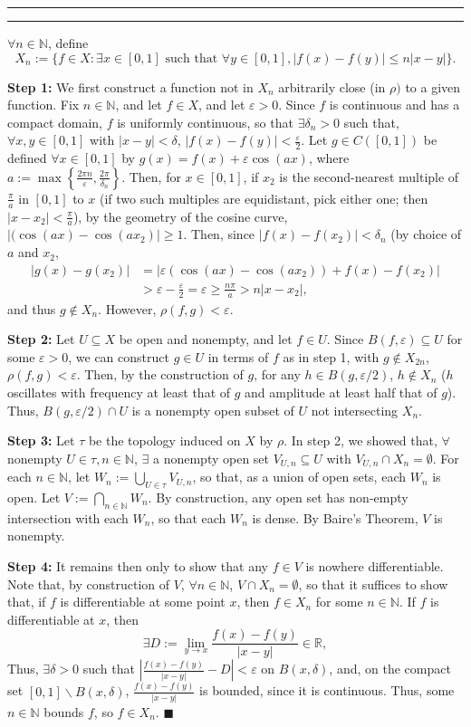 \documentclass[11pt]{article}
\newcounter{questionCounter}
\newcounter{partCounter}[questionCounter]
\newenvironment{question}[2][\arabic{questionCounter}]{%
    \setcounter{partCounter}{0}%
    \vspace{.25in} \hrule \vspace{0.5em}%
        \noindent{\bf #2}%
    \vspace{0.8em} \hrule \vspace{.10in}%
    \addtocounter{questionCounter}{1}%
}{}
\renewcommand{\qed}{\quad $\blacksquare$}
\newcommand{\sminus}{\backslash}
\newcommand{\N}{\mathbb{N}} %
\newcommand{\R}{\mathbb{R}} %
\newcommand{\e}{\varepsilon} %
\begin{document}
\newpage
\begin{question}{Problem 10}
$\forall n \in \N$, define
\[X_n := \{f \in X : \exists x \in [0,1] \mbox{ such that }
\forall y \in [0,1], |f(x) - f(y)| \leq n|x - y|\}.\]

{\bf Step 1:}
We first construct a function not in $X_n$ arbitrarily close (in $\rho)$ to a
given function. Fix $n \in \N$, and let $f \in X$, and let $\e > 0$. Since $f$
is continuous and has a compact domain, $f$ is uniformly continuous, so that
$\exists \delta_n > 0$ such that, $\forall x,y \in [0,1]$ with
$|x - y| < \delta$, $|f(x) - f(y)| < \frac{\e}{2}$. Let
$g \in C([0,1])$ be defined $\forall x \in [0,1]$ by
$g(x) = f(x) + \e\cos(ax)$, where
$a := \max\left\{\frac{2\pi n}{\e}, \frac{2\pi}{\delta_n}\right\}$. Then, for
$x \in [0,1]$, if $x_2$ is the second-nearest multiple of $\frac{\pi}{a}$ in
$[0,1]$ to $x$ (if two such multiples are equidistant, pick either one; then
$|x - x_2| < \frac{\pi}{a}$), by the geometry of the cosine curve,
$|(\cos(ax) - \cos(ax_2)| \geq 1$. Then, since $|f(x) - f(x_2)| < \delta_n$ (by
choice of $a$ and $x_2$,
\begin{align*}
|g(x) - g(x_2)|
 & = |\e(\cos(ax) - \cos(ax_2)) + f(x) - f(x_2)| \\
 & > \e - \frac{\e}{2}
 = \e
 \geq \frac{n\pi}{a} > n|x - x_2|, 
\end{align*}
and thus $g \notin X_n$. However, $\rho(f,g) < \e$.

{\bf Step 2:}
Let $U \subseteq X$ be open and nonempty, and let $f \in U$. Since
$B(f,\e) \subseteq U$ for some $\e > 0$, we can construct $g \in U$ in terms of
$f$ as in step 1, with $g \notin X_{2n}$, $\rho(f,g) < \e$. Then, by
the construction of $g$, for any $h \in B(g,\e/2)$, $h \notin X_n$ ($h$
oscillates with frequency at least that of $g$ and amplitude at least half that
of $g$). Thus, $B(g,\e/2) \cap U$ is a nonempty open subset of $U$ not
intersecting $X_n$.

{\bf Step 3:}
Let $\tau$ be the topology induced on $X$ by $\rho$. In step 2, we showed that,
$\forall$ nonempty $U \in \tau, n \in \N$, $\exists$ a nonempty open set
$V_{U,n} \subseteq U$ with $V_{U,n} \cap X_n = \emptyset$. For
each $n \in \N$, let $W_n := \bigcup_{U \in \tau} V_{U,n}$, so that, as a union
of open sets, each $W_n$ is open. Let $V := \bigcap_{n \in \N} W_n$. By
construction, any open set has non-empty intersection with each $W_n$, so that
each $W_n$ is dense. By Baire's Theorem, $V$ is nonempty.

{\bf Step 4:}
It remains then only to show that any $f \in V$ is nowhere differentiable. Note
that, by construction of $V$, $\forall n \in \N$, $V \cap X_n = \emptyset$, so
that it suffices to show that, if $f$ is differentiable at some point $x$, then
$f \in X_n$ for some $n \in \N$. If $f$ is differentiable at $x$, then
\[\exists D := \lim_{y \rightarrow x} \frac{f(x) - f(y)}{|x - y|} \in \R,\]
Thus, $\exists \delta > 0$ such that
$\left|\frac{f(x) - f(y)}{|x - y|} - D\right| < \e$ on $B(x,\delta)$, and, on
the compact set $[0,1] \sminus B(x,\delta)$, $\frac{f(x) - f(y)}{|x - y|}$ is
bounded, since it is continuous. Thus, some $n \in \N$ bounds $f$, so
$f \in X_n$. \qed
\end{question}
\end{document}
